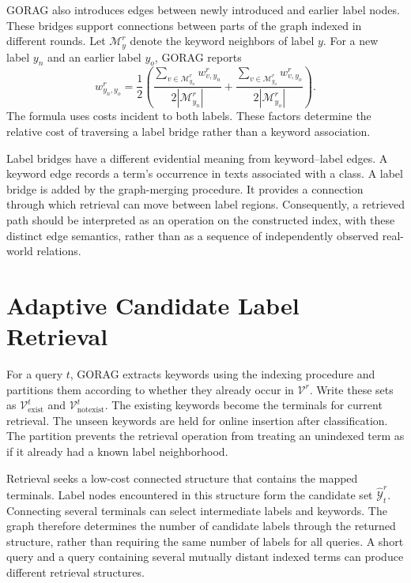 GORAG also introduces edges between newly introduced and earlier label nodes. These bridges support connections between parts of the graph indexed in different rounds. Let $\mathcal{M}_y^r$ denote the keyword neighbors of label $y$. For a new label $y_n$ and an earlier label $y_o$, GORAG reports
\begin{equation}
w_{y_n,y_o}^r=\frac{1}{2}\left(
\frac{\sum_{v\in\mathcal{M}_{y_n}^r}w_{v,y_n}^r}{2|\mathcal{M}_{y_n}^r|}
+\frac{\sum_{v\in\mathcal{M}_{y_o}^r}w_{v,y_o}^r}{2|\mathcal{M}_{y_o}^r|}
\right).
\label{eq:gorag:labelbridge}
\end{equation}
The formula uses costs incident to both labels. These factors determine the relative cost of traversing a label bridge rather than a keyword association.

Label bridges have a different evidential meaning from keyword--label edges. A keyword edge records a term's occurrence in texts associated with a class. A label bridge is added by the graph-merging procedure. It provides a connection through which retrieval can move between label regions. Consequently, a retrieved path should be interpreted as an operation on the constructed index, with these distinct edge semantics, rather than as a sequence of independently observed real-world relations.

\section{Adaptive Candidate Label Retrieval}
\label{sec:gorag:retrieval}

For a query $t$, GORAG extracts keywords using the indexing procedure and partitions them according to whether they already occur in $\mathcal{V}^r$. Write these sets as $\mathcal{V}_{\mathrm{exist}}^t$ and $\mathcal{V}_{\mathrm{notexist}}^t$. The existing keywords become the terminals for current retrieval. The unseen keywords are held for online insertion after classification. The partition prevents the retrieval operation from treating an unindexed term as if it already had a known label neighborhood.

Retrieval seeks a low-cost connected structure that contains the mapped terminals. Label nodes encountered in this structure form the candidate set $\widehat{\mathcal{Y}}_t^r$. Connecting several terminals can select intermediate labels and keywords. The graph therefore determines the number of candidate labels through the returned structure, rather than requiring the same number of labels for all queries. A short query and a query containing several mutually distant indexed terms can produce different retrieval structures.

